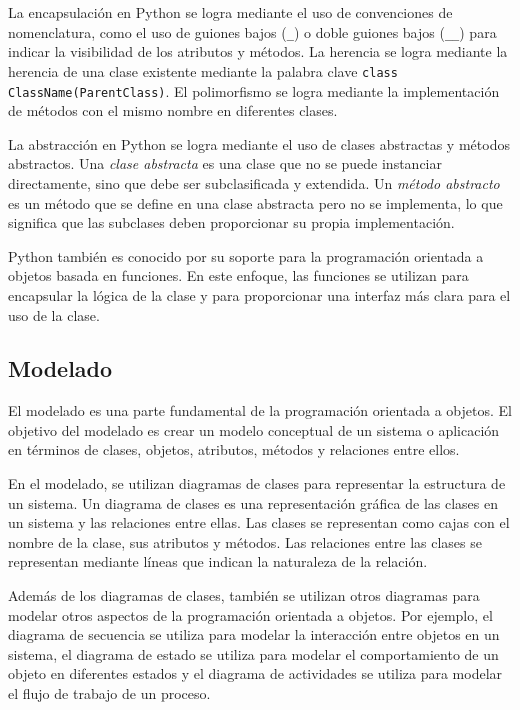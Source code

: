 \documentclass[executivepaper]{article}
\begin{document}
La encapsulación en Python se logra mediante el uso de convenciones de nomenclatura, como el uso de guiones bajos (\lstinline{_}) o doble guiones bajos (\lstinline{__}) para indicar la visibilidad de los atributos y métodos. La herencia se logra mediante la herencia de una clase existente mediante la palabra clave \lstinline{class ClassName(ParentClass)}. El polimorfismo se logra mediante la implementación de métodos con el mismo nombre en diferentes clases.

La abstracción en Python se logra mediante el uso de clases abstractas y métodos abstractos. Una \textit{clase abstracta} es una clase que no se puede instanciar directamente, sino que debe ser subclasificada y extendida. Un \textit{método abstracto} es un método que se define en una clase abstracta pero no se implementa, lo que significa que las subclases deben proporcionar su propia implementación.

Python también es conocido por su soporte para la programación orientada a objetos basada en funciones. En este enfoque, las funciones se utilizan para encapsular la lógica de la clase y para proporcionar una interfaz más clara para el uso de la clase.

\subsection{Modelado}
El modelado es una parte fundamental de la programación orientada a objetos. El objetivo del modelado es crear un modelo conceptual de un sistema o aplicación en términos de clases, objetos, atributos, métodos y relaciones entre ellos.

En el modelado, se utilizan diagramas de clases para representar la estructura de un sistema. Un diagrama de clases es una representación gráfica de las clases en un sistema y las relaciones entre ellas. Las clases se representan como cajas con el nombre de la clase, sus atributos y métodos. Las relaciones entre las clases se representan mediante líneas que indican la naturaleza de la relación.

Además de los diagramas de clases, también se utilizan otros diagramas para modelar otros aspectos de la programación orientada a objetos. Por ejemplo, el diagrama de secuencia se utiliza para modelar la interacción entre objetos en un sistema, el diagrama de estado se utiliza para modelar el comportamiento de un objeto en diferentes estados y el diagrama de actividades se utiliza para modelar el flujo de trabajo de un proceso.
\end{document}
